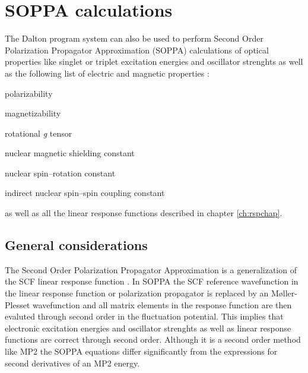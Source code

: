 \chapter{SOPPA calculations}\label{ch:soppa}

The Dalton program system can also be used to perform Second Order
Polarization Propagator Approximation (SOPPA) 
calculations \cite{esnpjjodjcp73,mjpekdtehjajjojcp,spascpl260,tejospastcan100} 
of optical properties like singlet or triplet excitation
energies and oscillator strenghts as well as the following list of
electric and magnetic properties :
\begin{center}
\begin{list}{}{}
\item polarizability
\item magnetizability
\item rotational {\em g} tensor
\item nuclear magnetic shielding constant
\item nuclear spin--rotation constant
\item indirect nuclear spin--spin coupling constant
\end{list}
\end{center}
as well as all the linear response functions described in chapter
\ref{ch:rspchap}.


\section{General considerations}\label{sec:soppageneral}

The Second Order Polarization Propagator Approximation is a
generalization of the SCF linear response
function \cite{esnpjjodjcp73,jodpjdycpr2,mjpekdtehjajjojcp}. In SOPPA the SCF 
reference wavefunction in the linear response function or polarization 
propagator is replaced by an M{\o}ller-Plesset wavefunction and all
matrix elements in the response function are then evaluted through
second order in the fluctuation potential. This implies that
electronic excitation energies and oscillator strenghts as well as
linear response functions are correct through second order. Although
it is a second order method like MP2 the SOPPA equations differ
significantly from the expressions for second derivatives of an MP2
energy. 


